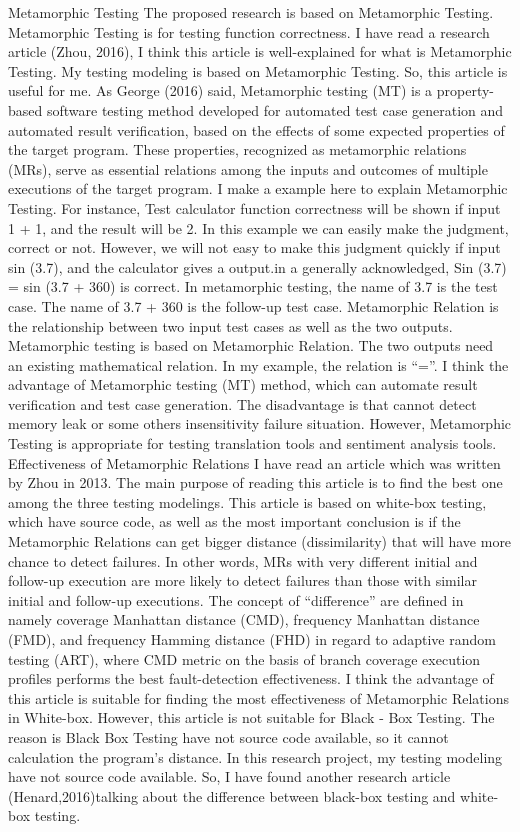 \documentclass[conference]{IEEEtran}
\begin{document}
Metamorphic Testing
The proposed research is based on Metamorphic Testing. Metamorphic Testing is for testing function correctness. I have read a research article (Zhou, 2016), I think this article is well-explained for what is Metamorphic Testing. My testing modeling is based on Metamorphic Testing. So, this article is useful for me. As George (2016) said, Metamorphic testing (MT) is a property-based software testing method developed for automated test case generation and automated result verification, based on the effects of some expected properties of the target program. These properties, recognized as metamorphic relations (MRs), serve as essential relations among the inputs and outcomes of multiple executions of the target program. I make a example here to explain Metamorphic Testing. For instance, Test calculator function correctness will be shown if input 1 + 1, and the result will be 2. In this example we can easily make the judgment, correct or not. However, we will not easy to make this judgment quickly if input sin (3.7), and the calculator gives a output.in a generally acknowledged, Sin (3.7) = sin (3.7 + 360) is correct. In metamorphic testing, the name of 3.7 is the test case. The name of 3.7 + 360 is the follow-up test case. Metamorphic Relation is the relationship between two input test cases as well as the two outputs. Metamorphic testing is based on Metamorphic Relation. The two outputs need an existing mathematical relation. In my example, the relation is “=”. I think the advantage of Metamorphic testing (MT) method, which can automate result verification and test case generation. The disadvantage is that cannot detect memory leak or some others insensitivity failure situation. However, Metamorphic Testing is appropriate for testing translation tools and sentiment analysis tools.
Effectiveness of Metamorphic Relations
I have read an article which was written by Zhou in 2013. The main purpose of reading this article is to find the best one among the three testing modelings. This article is based on white-box testing, which have source code, as well as the most important conclusion is if the Metamorphic Relations can get bigger distance (dissimilarity) that will have more chance to detect failures.  In other words, MRs with very different initial and follow-up execution are more likely to detect failures than those with similar initial and follow-up executions. The concept of “difference” are defined in namely coverage Manhattan distance (CMD), frequency Manhattan distance (FMD), and frequency Hamming distance (FHD) in regard to adaptive random testing (ART), where CMD metric on the basis of branch coverage execution profiles performs the best fault-detection effectiveness.
 I think the advantage of this article is suitable for finding the most
 effectiveness of Metamorphic Relations in White-box.
 However, this article is not suitable for Black - Box Testing.
 The reason is Black Box Testing have not source code available, so it cannot calculation the program’s distance. In this research project, my testing modeling have not source code available. So, I have found another research article (Henard,2016)talking about the difference between black-box testing and white-box testing.
\end{document}
